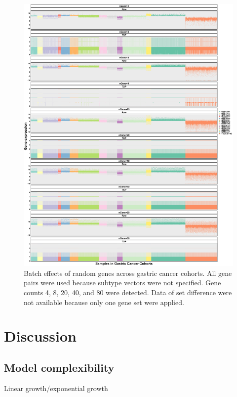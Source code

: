 \documentclass[
  12pt,
]{book}
\begin{document}
\begin{figure}

{\centering \includegraphics[width=0.9\linewidth]{./fig/bactch-effect-02} 

}

\caption{Batch effects of random genes across gastric cancer cohorts.  All gene pairs were used because subtype vectors were not specified. Gene counts 4, 8, 20, 40, and 80 were detected. Data of set difference were not available because only one gene set were applied.}\label{fig:be02}
\end{figure}

\hypertarget{discussion}{%
\chapter{Discussion}\label{discussion}}

\hypertarget{model-complexibility}{%
\section{Model complexibility}\label{model-complexibility}}

Linear growth/exponential growth
\end{document}
